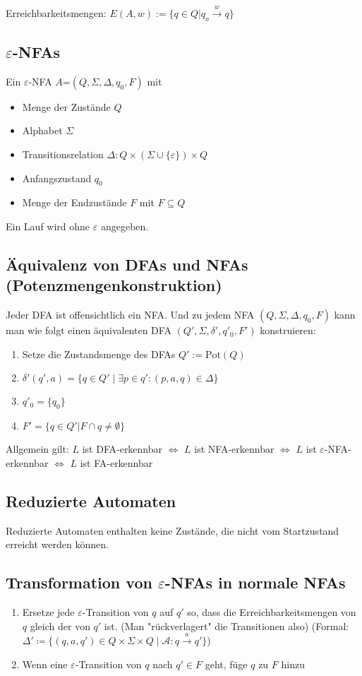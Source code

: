 \documentclass[11pt]{scrartcl}
\begin{document}
Erreichbarkeitsmengen: $E(A,w):=\{q \in Q| q_o \stackrel{w}{\to} q \}$

\subsection{$\varepsilon$-NFAs}
Ein $\varepsilon$-NFA $A$=$(Q, \Sigma, \Delta, q_0, F)$ mit
\begin{itemize}
	\item Menge der Zustände $Q$
    \item Alphabet $\Sigma$
    \item Transitionsrelation $\Delta: Q \times(\Sigma \cup \{\varepsilon\}) \times Q$
    \item Anfangszustand $q_0$
    \item Menge der Endzustände $F$ mit $F \subseteq Q$
\end{itemize}

Ein Lauf wird ohne $\varepsilon$ angegeben.

\subsection{Äquivalenz von DFAs und NFAs (Potenzmengenkonstruktion)}
Jeder DFA ist offensichtlich ein NFA. Und zu jedem NFA $(Q,\Sigma,\Delta,q_0,F)$ kann man wie folgt einen äquivalenten DFA $(Q', \Sigma, \delta', q'_0, F')$ konstruieren:
\begin{enumerate}
	\item Setze die Zustandsmenge des DFAs $Q' := \mathrm{Pot}(Q)$
	\item $\delta'(q',a) = \{q \in Q' \mid \exists p \in q': (p,a,q) \in \Delta \}$
	\item $q'_0 = \{q_0\}$
    \item $F' = \{q \in Q' \vert F \cap q \neq \emptyset \}$
\end{enumerate}

Allgemein gilt: $L$ ist DFA-erkennbar $\Leftrightarrow$ $L$ ist NFA-erkennbar $\Leftrightarrow$ $L$ ist $\varepsilon$-NFA-erkennbar $\Leftrightarrow$ $L$ ist FA-erkennbar

\subsection{Reduzierte Automaten}
Reduzierte Automaten enthalten keine Zustände, die nicht vom Startzustand erreicht werden können.

\subsection{Transformation von $\varepsilon$-NFAs in normale NFAs}
\begin{enumerate}
	\item{Ersetze jede $\varepsilon$-Transition von $q$ auf $q'$ so, dass die Erreichbarkeitsmengen von $q$ gleich der von $q'$ ist. (Man "rückverlagert" die Transitionen also) (Formal: $\Delta' \coloneqq \{(q,a,q') \in Q \times \Sigma \times Q\mid \mathcal{A}: q \stackrel{a}{\rightarrow} q'\}$)}
	\item{Wenn eine $\varepsilon$-Transition von $q$ nach $q' \in F$ geht, füge $q$ zu $F$ hinzu}
\end{enumerate}
\end{document}
